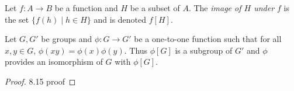 \begin{definition}
    Let $f\colon A\to B$ be a function and $H$ be a subset of $A$. The \emph{image of $H$ under $f$} is the set $\{f(h) \mid h \in H\}$ and is denoted $f[H].$
\end{definition}
\begin{lemma}
    Let $G, G'$ be groups and $\phi\colon G\to G'$ be a one-to-one function such that for all $x,y \in G$, $\phi(xy) = \phi(x)\phi(y).$ Thus $\phi[G]$ is a subgroup of $G'$ and $\phi$ provides an isomorphism of $G$ with $\phi[G]$.
\end{lemma}
\begin{proof}
    8.15 proof
\end{proof}





